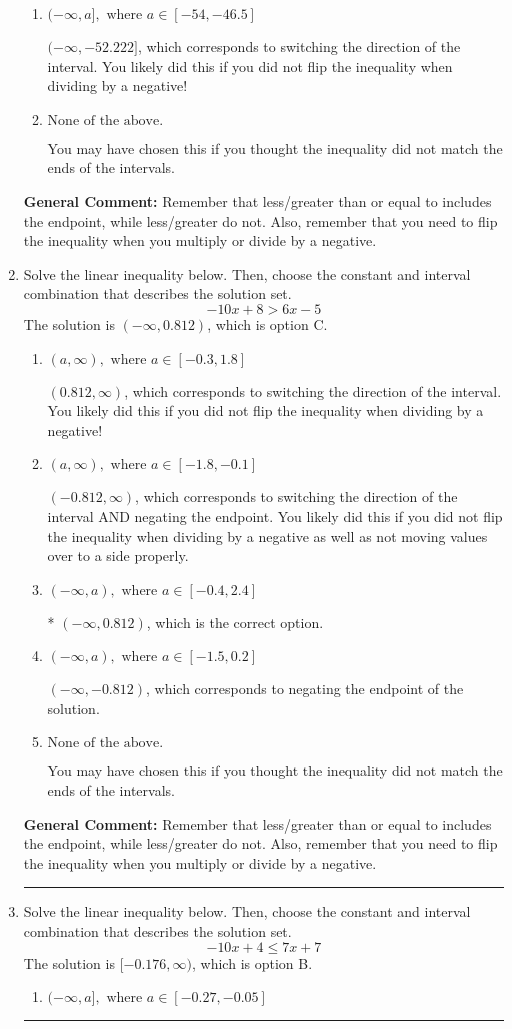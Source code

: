 \documentclass{extbook}[14pt]
\newcommand{\litem}[1]{\item #1

\rule{\textwidth}{0.4pt}}
\begin{document}
\begin{enumerate}
{\begin{enumerate}[label=\Alph*.]
* $[-52.222, \infty)$, which is the correct option.
\item \( (-\infty, a], \text{ where } a \in [-54, -46.5] \)

 $(-\infty, -52.222]$, which corresponds to switching the direction of the interval. You likely did this if you did not flip the inequality when dividing by a negative!
\item \( \text{None of the above}. \)

You may have chosen this if you thought the inequality did not match the ends of the intervals.
\end{enumerate}

\textbf{General Comment:} Remember that less/greater than or equal to includes the endpoint, while less/greater do not. Also, remember that you need to flip the inequality when you multiply or divide by a negative.
}
\litem{
Solve the linear inequality below. Then, choose the constant and interval combination that describes the solution set.
\[ -10x + 8 > 6x -5 \]The solution is \( (-\infty, 0.812) \), which is option C.\begin{enumerate}[label=\Alph*.]
\item \( (a, \infty), \text{ where } a \in [-0.3, 1.8] \)

 $(0.812, \infty)$, which corresponds to switching the direction of the interval. You likely did this if you did not flip the inequality when dividing by a negative!
\item \( (a, \infty), \text{ where } a \in [-1.8, -0.1] \)

 $(-0.812, \infty)$, which corresponds to switching the direction of the interval AND negating the endpoint. You likely did this if you did not flip the inequality when dividing by a negative as well as not moving values over to a side properly.
\item \( (-\infty, a), \text{ where } a \in [-0.4, 2.4] \)

* $(-\infty, 0.812)$, which is the correct option.
\item \( (-\infty, a), \text{ where } a \in [-1.5, 0.2] \)

 $(-\infty, -0.812)$, which corresponds to negating the endpoint of the solution.
\item \( \text{None of the above}. \)

You may have chosen this if you thought the inequality did not match the ends of the intervals.
\end{enumerate}

\textbf{General Comment:} Remember that less/greater than or equal to includes the endpoint, while less/greater do not. Also, remember that you need to flip the inequality when you multiply or divide by a negative.
}
\litem{
Solve the linear inequality below. Then, choose the constant and interval combination that describes the solution set.
\[ -10x + 4 \leq 7x + 7 \]The solution is \( [-0.176, \infty) \), which is option B.\begin{enumerate}[label=\Alph*.]
\item \( (-\infty, a], \text{ where } a \in [-0.27, -0.05] \)


\end{enumerate}}
\end{enumerate}
\end{document}
